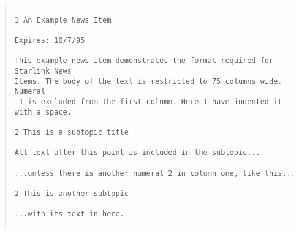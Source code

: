\begin{quote}\small
\begin{verbatim}

1 An Example News Item
                                                         Expires: 10/7/95

This example news item demonstrates the format required for Starlink News 
Items. The body of the text is restricted to 75 columns wide.  Numeral
 1 is excluded from the first column. Here I have indented it with a space.

2 This is a subtopic title

All text after this point is included in the subtopic...

...unless there is another numeral 2 in column one, like this...

2 This is another subtopic

...with its text in here.
                                                      
\end{verbatim}   
\end{quote}


